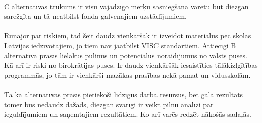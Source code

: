 \paragraph{}
C alternatīvas trūkums ir visu vajadzīgo mērķu sasniegšanā varētu būt diezgan sarežģīta un tā neatbilst fonda
galvenajiem uzstādījumiem.
\paragraph{}
Runājor par riskiem, tad šeit daudz vienkāršāk ir izveidot materiālus pēc skolas Latvijas iedzīvotājiem, jo tiem
nav jāatbilst VISC standartiem. Attiecīgi B alternatīva prasīs lielākus pūliņus un potenciālus noraidījumus no
valsts puses. Kā arī ir riski no birokrātijas puses. Ir daudz vienkāršāk iesaistīties tālākizlgītības programmās, jo
tām ir vienkārši mazākas prasības nekā pamat un vidusskolām.
\paragraph{}
Tā kā alternatīvas prasīs pietiekoši līdzīgus darba resursus, bet gala rezultāts tomēr būs nedaudz dažāds, diezgan
svarīgi ir veikt pilnu analīzi par ieguldījumiem un saņemtajiem rezultātiem. Ko arī varēs redzēt nākošās sadaļās.

